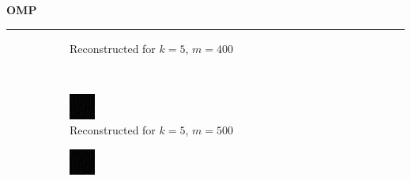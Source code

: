 \documentclass[a4paper,12pt]{article}
\newenvironment{solution}[2][]{%
    \begin{mdframed}[linecolor=blue!70!black, linewidth=2pt, roundcorner=10pt, backgroundcolor=yellow!10!white, skipabove=12pt, skipbelow=12pt]%
        \textbf{\large #2}
        \par\noindent\rule{\textwidth}{0.4pt}
}{
    \end{mdframed}
}
\begin{document}
\begin{solution}{OMP}
\begin{figure}[H]
\begin{subfigure}[t]{0.23\textwidth}
        \caption{Reconstructed for $k = 5$, $m = 400$}
    \end{subfigure}\\
    \begin{subfigure}[t]{0.23\textwidth}
        \centering
        \includegraphics[width=\textwidth]{../images/omp/Reconstructed_k_5_m_500.png}
        \caption{Reconstructed for $k = 5$, $m = 500$}
    \end{subfigure}
    \begin{subfigure}[t]{0.23\textwidth}
        \centering
        \includegraphics[width=\textwidth]{../images/omp/Reconstructed_k_5_m_600.png}

\end{subfigure}
\end{figure}
\end{solution}
\end{document}
